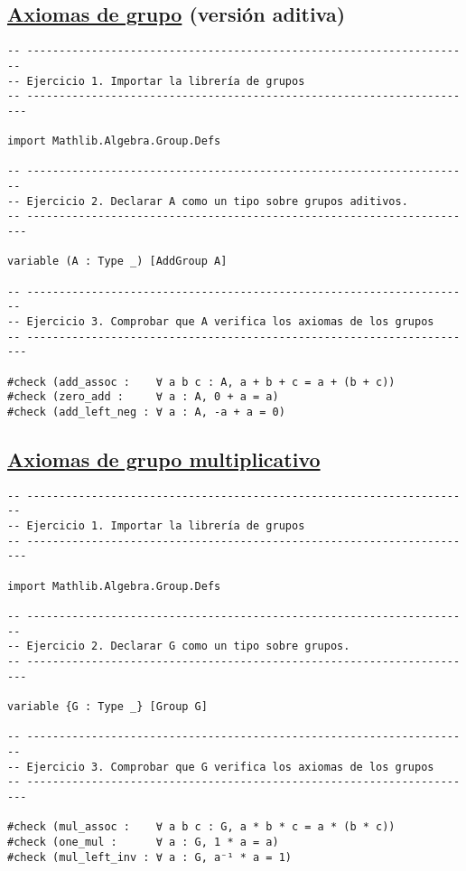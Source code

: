 \subsection{\href{./src/Basicos/Axiomas\_de\_grupo.lean}{Axiomas de grupo} (versión aditiva)}
\label{sec:org37a10fa}
\begin{verbatim}
-- ---------------------------------------------------------------------
-- Ejercicio 1. Importar la librería de grupos
-- ----------------------------------------------------------------------

import Mathlib.Algebra.Group.Defs

-- ---------------------------------------------------------------------
-- Ejercicio 2. Declarar A como un tipo sobre grupos aditivos.
-- ----------------------------------------------------------------------

variable (A : Type _) [AddGroup A]

-- ---------------------------------------------------------------------
-- Ejercicio 3. Comprobar que A verifica los axiomas de los grupos
-- ----------------------------------------------------------------------

#check (add_assoc :    ∀ a b c : A, a + b + c = a + (b + c))
#check (zero_add :     ∀ a : A, 0 + a = a)
#check (add_left_neg : ∀ a : A, -a + a = 0)
\end{verbatim}

\subsection{\href{./src/Basicos/Axiomas\_de\_grupo\_multiplicativo.lean}{Axiomas de grupo multiplicativo}}
\label{sec:org4475958}
\begin{verbatim}
-- ---------------------------------------------------------------------
-- Ejercicio 1. Importar la librería de grupos
-- ----------------------------------------------------------------------

import Mathlib.Algebra.Group.Defs

-- ---------------------------------------------------------------------
-- Ejercicio 2. Declarar G como un tipo sobre grupos.
-- ----------------------------------------------------------------------

variable {G : Type _} [Group G]

-- ---------------------------------------------------------------------
-- Ejercicio 3. Comprobar que G verifica los axiomas de los grupos
-- ----------------------------------------------------------------------

#check (mul_assoc :    ∀ a b c : G, a * b * c = a * (b * c))
#check (one_mul :      ∀ a : G, 1 * a = a)
#check (mul_left_inv : ∀ a : G, a⁻¹ * a = 1)
\end{verbatim}

